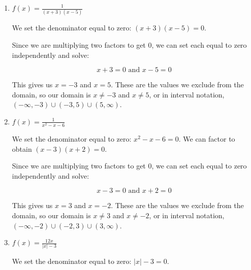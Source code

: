 \documentclass{ximera}
\begin{document}
\begin{enumerate}
	\item \begin{example}

$f(x) = \frac{1}{(x + 3)(x - 5)}$
		\begin{explanation}
			\begin{expandable}

We set the denominator equal to zero: $(x + 3)(x - 5) = 0$. 

Since we are multiplying two factors to get 0, we can set each equal to zero independently and solve: 

$$x + 3 = 0 \text{ and } x - 5 = 0$$

This gives us $x = -3$ and $x = 5$. These are the values we exclude from the domain, so our domain is $x \ne -3$ and $x \ne 5$, or in interval notation, $(-\infty, -3) \cup (-3, 5) \cup (5, \infty)$.
			\end{expandable} 
		\end{explanation}
		\end{example}
	\item \begin{example}

$f(x) = \frac{1}{x^2 - x - 6}$
		\begin{explanation}
			\begin{expandable}

We set the denominator equal to zero: $x^2 - x - 6 = 0$. We can factor to obtain $(x - 3)(x + 2) = 0$. 

Since we are multiplying two factors to get 0, we can set each equal to zero independently and solve: 

$$x - 3 = 0 \text{ and } x + 2 = 0$$

This gives us $x = 3$ and $x = -2$. These are the values we exclude from the domain, so our domain is $x \ne 3$ and $x \ne -2$, or in interval notation, $(-\infty, -2) \cup (-2, 3) \cup (3, \infty)$. 
			\end{expandable}
		\end{explanation}
		\end{example}
	\item \begin{example}

$f(x) = \frac{12x}{|x| - 3}$
		\begin{explanation}
			\begin{expandable}

We set the denominator equal to zero: $|x| - 3 = 0$.


\end{expandable}
\end{explanation}
\end{example}
\end{enumerate}
\end{document}
